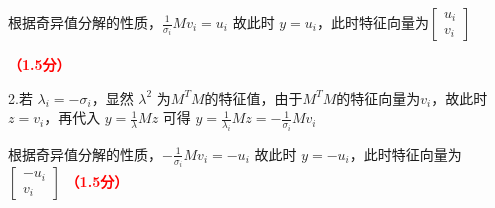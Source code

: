 \documentclass[12pt,a4paper,openany,twoside]{ctexbook}
\begin{document}
\begin{Solution}
根据奇异值分解的性质，$\frac{1}{\sigma_i}Mv_i=u_i$ 故此时 $y=u_i$，此时特征向量为$\begin{bmatrix}
u_i \\
v_i 
\end{bmatrix}$

\hfill \textcolor{red}{\textbf{（1.5分）}}

2.若 $\lambda_i=-\sigma_i$，显然 ${\lambda}^2$ 为$M^TM$的特征值，由于$M^TM$的特征向量为$v_i$，故此时$z=v_i$，再代入 $y=\frac{1}{\lambda}Mz$ 可得 $y=\frac{1}{\lambda_i}Mz=-\frac{1}{\sigma_i}Mv_i$

根据奇异值分解的性质，$-\frac{1}{\sigma_i}Mv_i=-u_i$ 故此时 $y=-u_i$，此时特征向量为$\begin{bmatrix}
-u_i \\
v_i 
\end{bmatrix}$
\hfill \textcolor{red}{\textbf{（1.5分）}}

\end{Solution}
\end{document}
